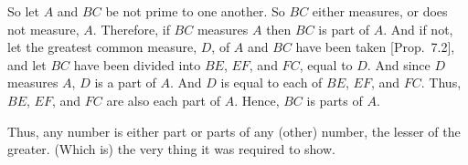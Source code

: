 \begin{Parallel}{}{}
{\epsfysize=2in
\centerline{}

So let  $A$ and $BC$  be not prime to one another. So $BC$ either measures, or
does not measure, $A$. Therefore, if $BC$ measures $A$ then $BC$ is part of
$A$. And if not, let the greatest common measure, $D$, of $A$ and
$BC$ have been taken [Prop.~7.2], and
let $BC$ have been divided into $BE$, $EF$, and $FC$, equal to $D$. And since
$D$ measures $A$, $D$ is a part of $A$. And $D$ is equal to each of $BE$, $EF$, and
$FC$. Thus, $BE$, $EF$, and $FC$ are also each part of $A$. Hence, $BC$ is parts of $A$.

Thus, any number is either part or parts of any (other) number, the
lesser of the greater. (Which is) the very thing it was required to show.}
\end{Parallel}

